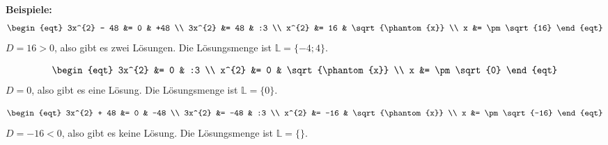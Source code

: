 \begin{example}
  \textbf{Beispiele:}
  \[\begin{eqt}
    3x^{2} - 48 &= 0     & +48 \\
         3x^{2} &= 48    & :3  \\
          x^{2} &= 16    & \sqrt{\phantom{x}} \\
              x &= \pm \sqrt{16}
  \end{eqt}\]
  $D=16 > 0$, also gibt es zwei Lösungen. Die Lösungsmenge ist $\mathbb{L} = \{-4;4\}$.

  \[\begin{eqt}
         3x^{2} &= 0    & :3  \\
          x^{2} &= 0    & \sqrt{\phantom{x}} \\
              x &= \pm\sqrt{0}
  \end{eqt}\]
  $D=0$, also gibt es eine Lösung. Die Lösungsmenge ist $\mathbb{L} = \{0\}$.

  \[\begin{eqt}
    3x^{2} + 48 &= 0     & -48 \\
         3x^{2} &= -48   & :3  \\
          x^{2} &= -16   & \sqrt{\phantom{x}} \\
              x &= \pm \sqrt{-16}
  \end{eqt}\]
  $D=-16 < 0$, also gibt es keine Lösung. Die Lösungsmenge ist $\mathbb{L} = \{\}$.
\end{example}

